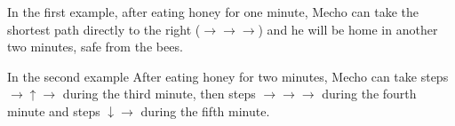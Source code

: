 In the first example, after eating honey for one minute, Mecho can take the shortest path directly to the right ($\rightarrow\rightarrow\rightarrow$) and he will be home in another two minutes, safe from the bees. 

In the second example After eating honey for two minutes, Mecho can take steps $\rightarrow\uparrow\rightarrow$ during the third minute, then steps $\rightarrow\rightarrow\rightarrow$ during the fourth minute and steps $\downarrow\rightarrow$ during the fifth minute.